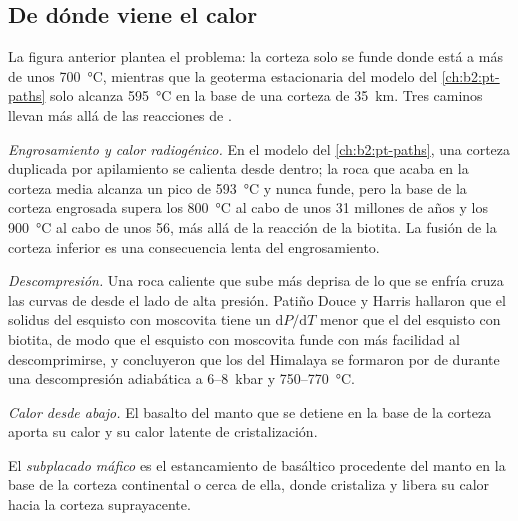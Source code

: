 \subsection*{De dónde viene el calor}

La figura anterior plantea el problema: la corteza solo se funde donde está a más de unos
\qty{700}{\celsius}, mientras que la geoterma estacionaria del modelo del \cref{ch:b2:pt-paths}
solo alcanza \qty{595}{\celsius} en la base de una corteza de \qty{35}{km}. Tres caminos llevan
más allá de las reacciones de .

\emph{Engrosamiento y calor radiogénico.} En el modelo del \cref{ch:b2:pt-paths}, una corteza
duplicada por apilamiento se calienta desde dentro; la roca que acaba en la corteza media alcanza un pico de
\qty{593}{\celsius} y nunca funde, pero la base de la corteza engrosada supera los
\qty{800}{\celsius} al cabo de unos 31 millones de años y los \qty{900}{\celsius} al cabo de unos 56, más allá de
la reacción de la biotita. La fusión de la corteza inferior es una consecuencia lenta del engrosamiento.

\emph{Descompresión.} Una roca caliente que sube más deprisa de lo que se enfría cruza las
curvas de  desde el lado de alta presión. Patiño Douce y Harris hallaron que
el solidus del esquisto con moscovita tiene un $\mathrm{d}P/\mathrm{d}T$ menor que el del
esquisto con biotita, de modo que el esquisto con moscovita funde con más facilidad al descomprimirse, y
concluyeron que los  del Himalaya se formaron por  de 
durante una descompresión adiabática a 6--\qty{8}{kbar} y 750--\qty{770}{\celsius}.

\emph{Calor desde abajo.} El basalto del manto que se detiene en la base de la corteza aporta
su calor y su calor latente de cristalización.

\begin{definition}\label{def:b2:crustal-melting:underplating}
El \emph{subplacado máfico} es el estancamiento de  basáltico
procedente del manto en la base de la corteza continental o cerca de ella, donde cristaliza y
libera su calor hacia la corteza suprayacente.
\end{definition}

